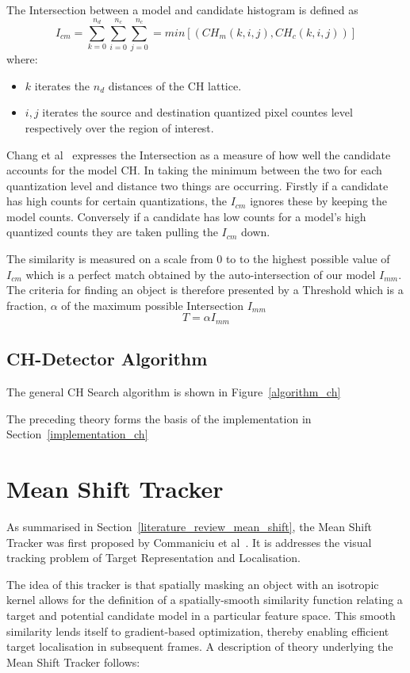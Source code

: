 The Intersection between a model and candidate histogram is defined as
$$I_{cm} = \sum_{k=0}^{n_d}\sum_{i=0}^{n_c}\sum_{j=0}^{n_c} = min[(CH_m(k,i,j),CH_c(k,i,j))]$$
where:
\begin{itemize}
    \item $k$ iterates the $n_d$ distances of the CH lattice.
    \item $i,j$ iterates the source and destination quantized pixel countes level respectively over the
        region of interest.
\end{itemize}
Chang et al~\cite{Chang1999} expresses the Intersection as a measure of how well the
candidate accounts for the model CH\@. In taking the minimum between the two
for each quantization level and distance two things are occurring. Firstly if a
candidate has high counts for certain quantizations, the $I_{cm}$ ignores these
by keeping the model counts. Conversely if a candidate has low counts for a
model's high quantized counts they are taken pulling the $I_{cm}$ down.

The similarity is measured on a scale from 0 to to the highest possible value of
$I_{cm}$ which is a perfect match obtained by the auto-intersection of our
model $I_{mm}$.
The criteria for finding an object is therefore presented by a Threshold which
is a fraction, $\alpha$ of the maximum possible Intersection $I_{mm}$
$$T=\alpha I_{mm}$$


\subsection{CH-Detector Algorithm}
The general CH Search algorithm is shown in Figure~\ref{algorithm_ch}

The preceding theory forms the basis of the implementation in Section~\ref{implementation_ch}


\section{Mean Shift Tracker}\label{theoretical_framework_mean_shift_tracker}
As summarised in Section~\ref{literature_review_mean_shift}, the Mean Shift Tracker was
first proposed by Commaniciu et al~\cite{Comaniciu2003}. It is addresses the
visual tracking problem of Target Representation and Localisation.

The idea of this tracker is that spatially masking an object with an
isotropic kernel allows for the definition of a spatially-smooth similarity
function relating a target and potential candidate model in a particular feature
space. This smooth similarity lends itself to gradient-based optimization,
thereby enabling efficient target localisation in subsequent frames.
A description of theory underlying the Mean Shift Tracker follows:

